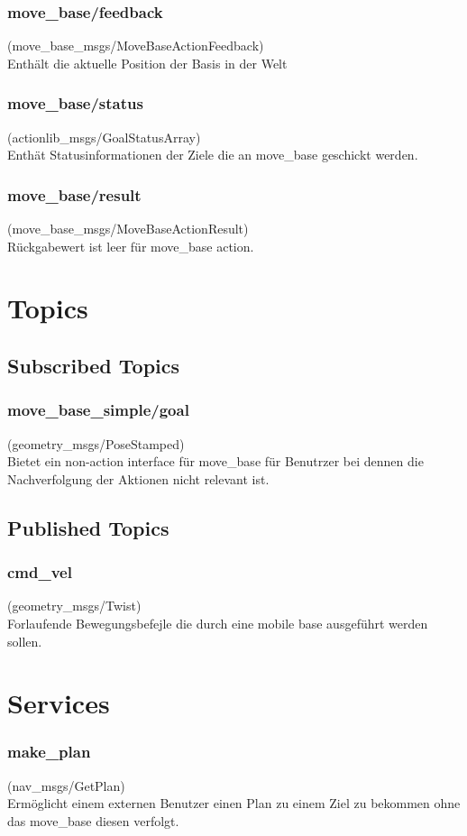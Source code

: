 \documentclass[oribibl]{llncs}
\begin{document}
\subsubsection{move\_base/feedback} (move\_base\_msgs/MoveBaseActionFeedback)\\
	Enthält die aktuelle Position der Basis in der Welt
\subsubsection{move\_base/status} (actionlib\_msgs/GoalStatusArray)\\
	Enthät Statusinformationen der Ziele die an move\_base geschickt werden.
\subsubsection{move\_base/result} (move\_base\_msgs/MoveBaseActionResult)\\
	Rückgabewert ist leer für move\_base action.
\section{Topics}
\subsection{Subscribed Topics}
\subsubsection{move\_base\_simple/goal} (geometry\_msgs/PoseStamped)\\
	Bietet ein non-action interface für move\_base für Benutrzer bei dennen die Nachverfolgung der Aktionen nicht relevant ist.
\subsection{Published Topics}
\subsubsection{cmd\_vel} (geometry\_msgs/Twist)\\
	Forlaufende Bewegungsbefejle die durch eine mobile base ausgeführt werden 	sollen.
	
\section{Services}
\subsubsection{make\_plan} (nav\_msgs/GetPlan)\\
	Ermöglicht einem externen Benutzer einen Plan zu einem Ziel zu bekommen ohne 	das move\_base diesen verfolgt.
\end{document}
